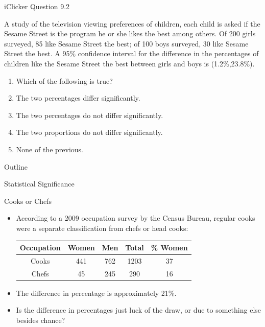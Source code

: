 \documentclass[14pt]{beamer}\usepackage[]{graphicx}\usepackage[]{color}
\begin{document}
\begin{frame}[fragile]{iClicker Question 9.2}

{\small{
A study of the television viewing preferences of children, each child is  asked if the Sesame Street is the program he or she likes the best  among others. Of 200 girls surveyed, 85 like Sesame Street the best;  of 100 boys surveyed, 30 like Sesame Street the best. A 95\%  confidence interval for the difference in the percentages of children like  the Sesame Street the best between girls and boys is (1.2\%,23.8\%).

\begin{enumerate}
\item Which of the following is true?
\item The two percentages differ significantly.
\item The two percentages do not differ significantly.
\item The two proportions do not differ significantly.
\item None of the previous.
\end{enumerate}
}}
\end{frame}

\begin{frame}[fragile]{Outline}

Statistical Significance  

\end{frame}

\begin{frame}[fragile]{Cooks or Chefs}

\begin{itemize}
\item According to a 2009 occupation survey by the Census Bureau, regular cooks were a separate classification from chefs or head cooks:

\vspace{3mm}

\begin{tabular}{@{} ccccc @{}} \hline
Occupation & Women & Men & Total & \% Women \\ \hline
Cooks & 441 & 762 & 1203 & 37 \\
Chefs & 45  & 245 & 290  & 16 \\ \hline
\end{tabular}

\item The difference in percentage is approximately 21\%.
\item Is the difference in percentages just luck of the draw, or due to something  else besides chance?
\end{itemize}
\end{frame}
\end{document}
